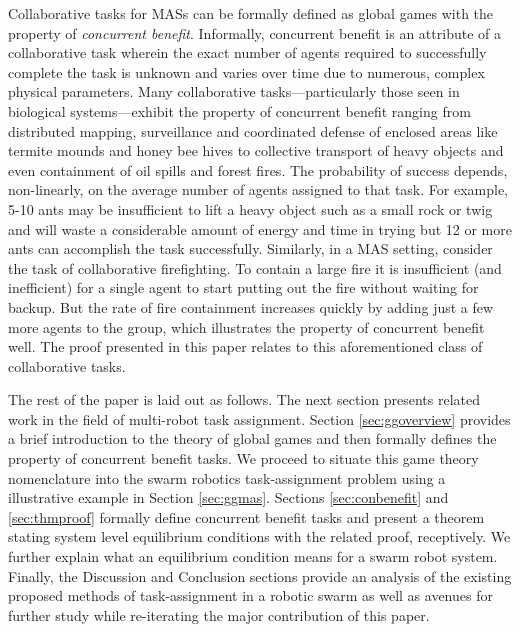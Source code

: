 \documentclass[conference]{ieeeconf}
\begin{document}
Collaborative tasks for MASs can be formally defined as global games with the property of \emph{concurrent benefit}. Informally, concurrent benefit is an attribute of a collaborative task wherein the exact number of agents required to successfully complete the task is unknown and varies over time due to numerous, complex physical parameters. Many collaborative tasks---particularly those seen in biological systems---exhibit the property of concurrent benefit ranging from distributed mapping, surveillance and coordinated defense of enclosed areas like termite mounds and honey bee hives \cite{Breed1990} to collective transport of heavy objects and even containment of oil spills and forest fires. The probability of success depends, non-linearly, on the average number of agents assigned to that task. For example, 5-10 ants may be insufficient to lift a heavy object such as a small rock or twig and will waste a considerable amount of energy and time in trying but 12 or more ants can accomplish the task successfully. Similarly, in a MAS setting, consider the task of collaborative firefighting. To contain a large fire it is insufficient (and inefficient) for a single agent to start putting out the fire without waiting for backup. But the rate of fire containment increases quickly by adding just a few more agents to the group, which illustrates the property of concurrent benefit well. The proof presented in this paper relates to this aforementioned class of collaborative tasks.

The rest of the paper is laid out as follows. The next section presents related work in the field of multi-robot task assignment. Section \ref{sec:ggoverview} provides a brief introduction to the theory of global games and then formally defines the property of concurrent benefit tasks. We proceed to situate this game theory nomenclature into the swarm robotics task-assignment problem using a illustrative example in Section \ref{sec:ggmas}. Sections \ref{sec:conbenefit} and \ref{sec:thmproof} formally define concurrent benefit tasks and present a theorem stating system level equilibrium conditions with the related proof, receptively. We further explain what an equilibrium condition means for a swarm robot system. Finally, the Discussion and Conclusion sections provide an analysis of the existing proposed methods of task-assignment in a robotic swarm as well as avenues for further study while re-iterating the major contribution of this paper.
\end{document}

